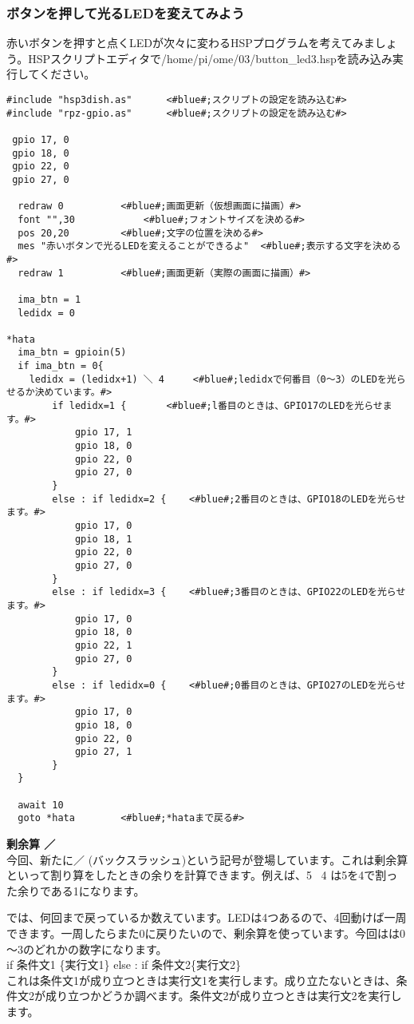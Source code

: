 \subsubsection{ボタンを押して光るLEDを変えてみよう}
赤いボタンを押すと点くLEDが次々に変わるHSPプログラムを考えてみましょう。HSPスクリプトエディタで/home/pi/ome/03/button\_led3.hspを読み込み実行してください。

\begin{lstlisting}[caption=button\_led3.hsp,label=button_led3.hsp]
#include "hsp3dish.as"		<#blue#;スクリプトの設定を読み込む#>
#include "rpz-gpio.as"		<#blue#;スクリプトの設定を読み込む#>

 gpio 17, 0
 gpio 18, 0
 gpio 22, 0
 gpio 27, 0
	
  redraw 0			<#blue#;画面更新（仮想画面に描画）#>
  font "",30			<#blue#;フォントサイズを決める#>
  pos 20,20			<#blue#;文字の位置を決める#>
  mes "赤いボタンで光るLEDを変えることができるよ"	<#blue#;表示する文字を決める#>
  redraw 1			<#blue#;画面更新（実際の画面に描画）#>

  ima_btn = 1
  ledidx = 0

*hata
  ima_btn = gpioin(5)
  if ima_btn = 0{
    ledidx = (ledidx+1) ＼ 4		<#blue#;ledidxで何番目（0～3）のLEDを光らせるか決めています。#>
		if ledidx=1 {		<#blue#;l番目のときは、GPIO17のLEDを光らせます。#>
			gpio 17, 1
			gpio 18, 0
			gpio 22, 0
			gpio 27, 0
		}
		else : if ledidx=2 {	<#blue#;2番目のときは、GPIO18のLEDを光らせます。#>
			gpio 17, 0
			gpio 18, 1
			gpio 22, 0
			gpio 27, 0
		}
		else : if ledidx=3 {	<#blue#;3番目のときは、GPIO22のLEDを光らせます。#>
			gpio 17, 0
			gpio 18, 0
			gpio 22, 1
			gpio 27, 0
		}
		else : if ledidx=0 {	<#blue#;0番目のときは、GPIO27のLEDを光らせます。#>
			gpio 17, 0
			gpio 18, 0
			gpio 22, 0
			gpio 27, 1
		}
  }

  await 10
  goto *hata		<#blue#;*hataまで戻る#>
\end{lstlisting}

\textbf{剰余算 ／}\\
今回、新たに／ (バックスラッシュ)という記号が登場しています。これは剰余算といって割り算をしたときの余りを計算できます。例えば、5 \ 4 は5を4で割った余りである1になります。

では、何回まで戻っているか数えています。LEDは4つあるので、4回動けば一周できます。一周したらまた0に戻りたいので、剰余算を使っています。今回はは0～3のどれかの数字になります。\\

if 条件文1 \{実行文1\} else : if 条件文2\{実行文2\}\\
これは条件文1が成り立つときは実行文1を実行します。成り立たないときは、条件文2が成り立つかどうか調べます。条件文2が成り立つときは実行文2を実行します。 \\


